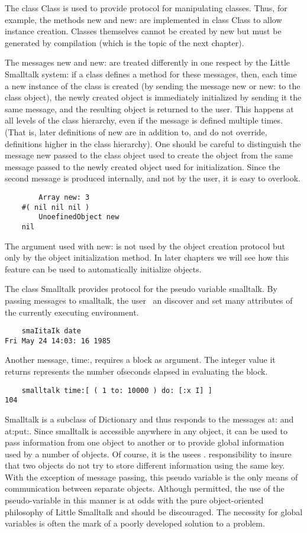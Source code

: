 
The class Class is used to provide protocol for manipulating classes. Thus,
for example, the methods new and new: are implemented in class Class
to allow instance creation. Classes themselves cannot be created by new
but must be generated by compilation (which is the topic of the next
chapter).

The messages new and new: are treated differently in one respect by
the Little Smalltalk system: if a class defines a method for these messages,
then, each time a new instance of the class is created (by sending the
message new or new: to the class object), the newly created object is immediately initialized by sending it the same message, and the resulting
object is returned to the user. This happens at all levels of the class hierarchy, even if the message is defined multiple times. (That is, later
definitions of new are in addition to, and do not override, definitions higher
in the class hierarchy). One should be careful to distinguish the message
new passed to the class object used to create the object from the same
message passed to the newly created object used for initialization. Since
the second message is produced internally, and not by the user, it is easy
to overlook.
\begin{lstlisting}
        Array new: 3
    #( nil nil nil )
        UnoefinedObject new
    nil
\end{lstlisting}

The argument used with new: is not used by the object creation protocol
but only by the object initialization method. In later chapters we will see
how this feature can be used to automatically initialize objects.

The class Smalltalk provides protocol for the pseudo variable smalltalk. By passing messages to smalltalk, the user ~an discover and set
many attributes of the currently executing environment.
\begin{lstlisting}
    smaIitaIk date
Fri May 24 14:03: 16 1985
\end{lstlisting}

Another message, time:, requires a block as argument. The integer value
it returns represents the number ofseconds elapsed in evaluating the block.
\begin{lstlisting}
    smalltalk time:[ ( 1 to: 10000 ) do: [:x I] ]
104
\end{lstlisting}

Smalltalk is a subclass of Dictionary and thus responds to the messages at: and at:put:. Since smalltalk is accessible anywhere in any object,
it can be used to pass information from one object to another or to provide
global information used by a number of objects. Of course, it is the usees .
responsibility to insure that two objects do not try to store different information using the same key. With the exception of message passing, this
pseudo variable is the only means of communication between separate
objects. Although permitted, the use of the pseudo-variable in this manner
is at odds with the pure object-oriented philosophy of Little Smalltalk and
should be discouraged. The necessity for global variables is often the mark
of a poorly developed solution to a problem.

